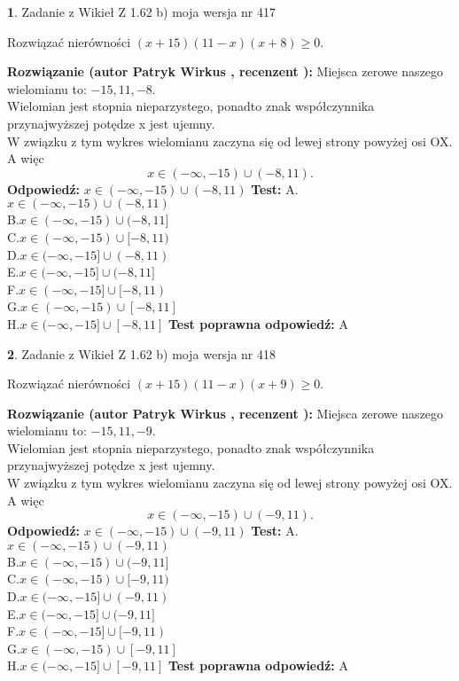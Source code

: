 \documentclass[12pt, a4paper]{article}
\theoremstyle{definition} %
\newtheorem{zad}{}
\newcommand{\zadStart}[1]{\begin{zad}#1\newline}
\newcommand{\zadStop}{\end{zad}}
\newcommand{\rozwStart}[2]{\noindent \textbf{Rozwiązanie (autor #1 , recenzent #2): }\newline}
\newcommand{\rozwStop}{\newline}
\newcommand{\odpStart}{\noindent \textbf{Odpowiedź:}\newline}
\newcommand{\odpStop}{\newline}
\newcommand{\testStart}{\noindent \textbf{Test:}\newline}
\newcommand{\testStop}{\newline}
\newcommand{\kluczStart}{\noindent \textbf{Test poprawna odpowiedź:}\newline}
\newcommand{\kluczStop}{\newline}
\begin{document}
\zadStart{Zadanie z Wikieł Z 1.62 b) moja wersja nr 417}

Rozwiązać nierówności $(x+15)(11-x)(x+8)\ge0$.
\zadStop
\rozwStart{Patryk Wirkus}{}
Miejsca zerowe naszego wielomianu to: $-15, 11, -8$.\\
Wielomian jest stopnia nieparzystego, ponadto znak współczynnika przy\linebreak najwyższej potędze x jest ujemny.\\ W związku z tym wykres wielomianu zaczyna się od lewej strony powyżej osi OX. A więc $$x \in (-\infty,-15) \cup (-8,11).$$
\rozwStop
\odpStart
$x \in (-\infty,-15) \cup (-8,11)$
\odpStop
\testStart
A.$x \in (-\infty,-15) \cup (-8,11)$\\
B.$x \in (-\infty,-15) \cup (-8,11]$\\
C.$x \in (-\infty,-15) \cup [-8,11)$\\
D.$x \in (-\infty,-15] \cup (-8,11)$\\
E.$x \in (-\infty,-15] \cup (-8,11]$\\
F.$x \in (-\infty,-15] \cup [-8,11)$\\
G.$x \in (-\infty,-15) \cup [-8,11]$\\
H.$x \in (-\infty,-15] \cup [-8,11]$
\testStop
\kluczStart
A
\kluczStop



\zadStart{Zadanie z Wikieł Z 1.62 b) moja wersja nr 418}

Rozwiązać nierówności $(x+15)(11-x)(x+9)\ge0$.
\zadStop
\rozwStart{Patryk Wirkus}{}
Miejsca zerowe naszego wielomianu to: $-15, 11, -9$.\\
Wielomian jest stopnia nieparzystego, ponadto znak współczynnika przy\linebreak najwyższej potędze x jest ujemny.\\ W związku z tym wykres wielomianu zaczyna się od lewej strony powyżej osi OX. A więc $$x \in (-\infty,-15) \cup (-9,11).$$
\rozwStop
\odpStart
$x \in (-\infty,-15) \cup (-9,11)$
\odpStop
\testStart
A.$x \in (-\infty,-15) \cup (-9,11)$\\
B.$x \in (-\infty,-15) \cup (-9,11]$\\
C.$x \in (-\infty,-15) \cup [-9,11)$\\
D.$x \in (-\infty,-15] \cup (-9,11)$\\
E.$x \in (-\infty,-15] \cup (-9,11]$\\
F.$x \in (-\infty,-15] \cup [-9,11)$\\
G.$x \in (-\infty,-15) \cup [-9,11]$\\
H.$x \in (-\infty,-15] \cup [-9,11]$
\testStop
\kluczStart
A
\kluczStop
\end{document}
